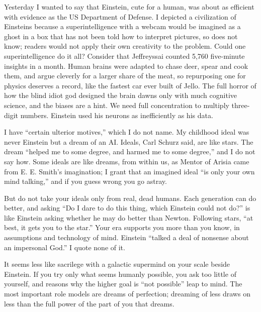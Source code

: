 Yesterday I wanted to say that Einstein, cute for a human, was about as efficient with evidence as the US Department of Defense. I depicted a civilization of Einsteins because a superintelligence with a webcam would be imagined as a ghost in a box that has not been told how to interpret pictures, so does not know; readers would not apply their own creativity to the problem. Could one superintelligence do it all? Consider that Jeffreyssai counted 5,760 five-minute insights in a month. Human brains were adapted to chase deer, spear and cook them, and argue cleverly for a larger share of the meat, so repurposing one for physics deserves a record, like the fastest car ever built of Jello. The full horror of how the blind idiot god designed the brain dawns only with much cognitive science, and the biases are a hint. We need full concentration to multiply three-digit numbers. Einstein used his neurons as inefficiently as his data. 

I have ``certain ulterior motives,'' which I do not name. My childhood ideal was never Einstein but a dream of an AI. Ideals, Carl Schurz said, are like stars. The dream ``helped me to some degree, and harmed me to some degree,'' and I do not say how.  Some ideals are like dreams, from within us, as Mentor of Arisia came from E. E. Smith's imagination; I grant that an imagined ideal ``is only your own mind talking,'' and if you guess wrong you go astray.

But do not take your ideals only from real, dead humans. Each generation can do better, and asking ``Do I dare to do this thing, which Einstein could not do?'' is like Einstein asking whether he may do better than Newton. Following stars, ``at best, it gets you to the star.'' Your era supports you more than you know, in assumptions and technology of mind.  Einstein ``talked a deal of nonsense about an impersonal God.'' I quote none of it. 

It seems less like sacrilege with a galactic supermind on your scale beside Einstein. If you try only what seems humanly possible, you ask too little of yourself, and reasons why the higher goal is ``not possible'' leap to mind. The most important role models are dreams of perfection; dreaming of less draws on less than the full power of the part of you that dreams.
